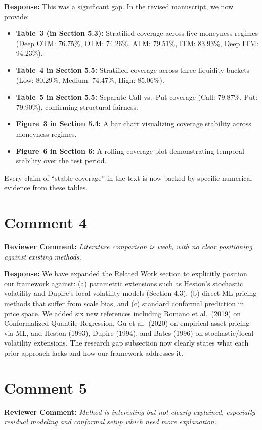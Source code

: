 \documentclass[11pt]{article}
\newcommand{\rev}[1]{\textbf{Reviewer Comment:} \textit{#1}}
\newcommand{\resp}[1]{\textbf{Response:} #1}
\begin{document}
\resp{This was a significant gap. In the revised manuscript, we now provide:
\begin{itemize}[nosep]
    \item \textbf{Table~3 (in Section 5.3):} Stratified coverage across five moneyness regimes (Deep OTM: 76.75\%, OTM: 74.26\%, ATM: 79.51\%, ITM: 83.93\%, Deep ITM: 94.23\%).
    \item \textbf{Table~4 in Section 5.5:} Stratified coverage across three liquidity buckets (Low: 80.29\%, Medium: 74.47\%, High: 85.06\%).
    \item \textbf{Table~5 in Section 5.5:} Separate Call vs.\ Put coverage (Call: 79.87\%, Put: 79.90\%), confirming structural fairness.
    \item \textbf{Figure~3 in Section 5.4:} A bar chart visualizing coverage stability across moneyness regimes.
    \item \textbf{Figure~6 in Section 6:} A rolling coverage plot demonstrating temporal stability over the test period.
\end{itemize}
Every claim of ``stable coverage'' in the text is now backed by specific numerical evidence from these tables.}

\section*{Comment 4}
\rev{Literature comparison is weak, with no clear positioning against existing methods.}

\resp{We have expanded the Related Work section to explicitly position our framework against: (a) parametric extensions such as Heston's stochastic volatility and Dupire's local volatility models (Section 4.3), (b) direct ML pricing methods that suffer from scale bias, and (c) standard conformal prediction in price space. We added six new references including Romano et al.\ (2019) on Conformalized Quantile Regression, Gu et al.\ (2020) on empirical asset pricing via ML, and Heston (1993), Dupire (1994), and Bates (1996) on stochastic/local volatility extensions. The research gap subsection now clearly states what each prior approach lacks and how our framework addresses it.}

\section*{Comment 5}
\rev{Method is interesting but not clearly explained, especially residual modeling and conformal setup which need more explanation.}
\end{document}
